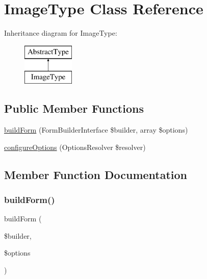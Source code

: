\hypertarget{class_app_1_1_form_1_1_image_type}{}\section{Image\+Type Class Reference}
\label{class_app_1_1_form_1_1_image_type}
Inheritance diagram for Image\+Type\+:\begin{figure}[H]
\begin{center}
\leavevmode
\includegraphics[height=2.000000cm]{class_app_1_1_form_1_1_image_type}
\end{center}
\end{figure}
\subsection*{Public Member Functions}
\begin{DoxyCompactItemize}
\item 
\mbox{\hyperlink{class_app_1_1_form_1_1_image_type_a83c3745710374f9c5a1eb0686fe2dfab}{build\+Form}} (Form\+Builder\+Interface \$builder, array \$options)
\item 
\mbox{\hyperlink{class_app_1_1_form_1_1_image_type_a8ff68a86f5090b5df973286836e46ead}{configure\+Options}} (Options\+Resolver \$resolver)
\end{DoxyCompactItemize}


\subsection{Member Function Documentation}
\mbox{\label{class_app_1_1_form_1_1_image_type_a83c3745710374f9c5a1eb0686fe2dfab}} 
\subsubsection{\texorpdfstring{buildForm()}{buildForm()}}
{\footnotesize\ttfamily build\+Form (\begin{DoxyParamCaption}\item[{Form\+Builder\+Interface}]{\$builder,  }\item[{array}]{\$options }\end{DoxyParamCaption})}

